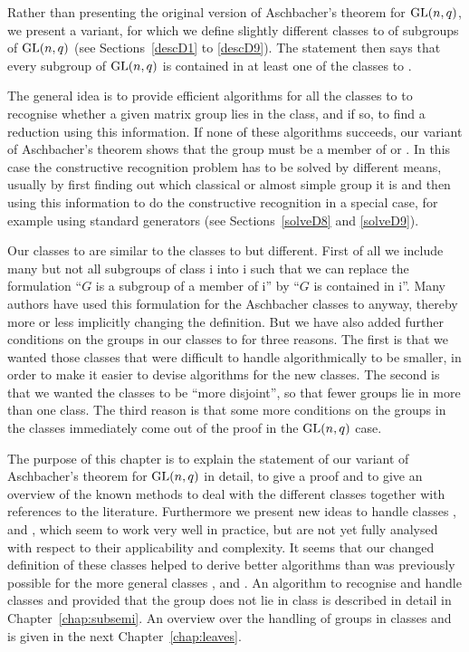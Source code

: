 Rather than presenting the original version of Aschbacher's theorem
for $\GL(n,q)$, we present a variant, for which we define slightly
different classes  to  of subgroups of $\GL(n,q)$ (see 
Sections~\ref{descD1} to \ref{descD9}). The statement
then says that every subgroup of $\GL(n,q)$ is contained in at least one
of the classes  to . 

The general idea is to provide efficient algorithms for all the classes  to
 to recognise whether a given matrix group lies in the class, and if
so, to find a reduction using this information. If none of these algorithms
succeeds, our variant of Aschbacher's theorem shows that the group must
be a member of  or . In this case the constructive recognition problem
has to be
solved by different means, usually by first finding out which classical
or almost simple group it is and then using this information to do the
constructive recognition in a special case, for example using standard
generators (see Sections~\ref{solveD8} and \ref{solveD9}).

Our classes  to  are similar to the classes  to  but
different. First of all we include many but not all subgroups of
class \CC i into \DD i such that we can replace the formulation ``$G$ is a
subgroup of a member of \CC i'' by ``$G$ is contained in \DD i''. Many
authors have used this formulation for the Aschbacher classes  to
 anyway, thereby more or less implicitly changing the definition. 
But we have also added further conditions on the groups
in our classes  to  for three reasons. The first is that we
wanted those classes that were difficult to handle algorithmically
to be smaller, in order to make it easier to devise algorithms for
the new classes. The second is that we wanted the classes to be
``more disjoint'', so that fewer groups lie in more than one
class. The third reason is that some more conditions on the groups in
the classes immediately come out of the proof in the $\GL(n,q)$ case.

The purpose of this chapter is to explain the statement of our variant 
of Aschbacher's 
theorem for $\GL(n,q)$ in detail, to give a proof and to give an
overview of the known methods to deal with the different classes
together with references to the literature. Furthermore we present new 
ideas to handle classes ,  and , which seem to work very
well in practice, but are not yet fully analysed with respect to their
applicability and complexity. It seems that our changed definition of
these classes helped to derive better algorithms than was previously
possible for the more general classes ,  and .
An algorithm to recognise
and handle classes  and  provided that the group does not lie in
class  is described in detail in Chapter~\ref{chap:subsemi}.
An overview over the handling of groups in classes  and  is
given in the next Chapter~\ref{chap:leaves}.

